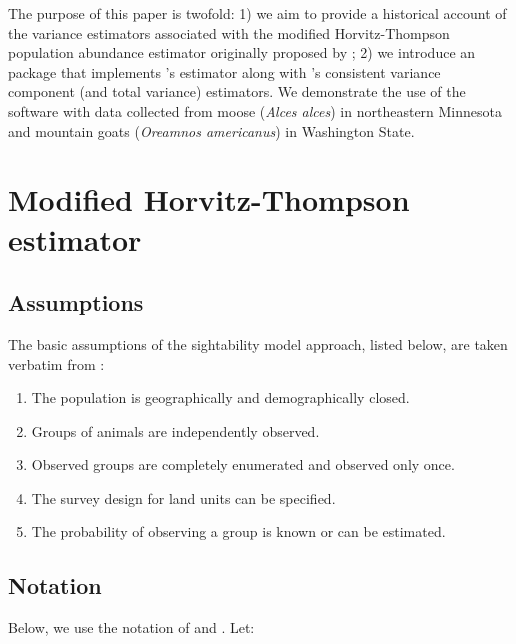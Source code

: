 \documentclass[nojss]{jss}
\begin{document}
The purpose of this paper is twofold:  1) we aim to provide a
historical account of the variance estimators associated with the
modified Horvitz-Thompson population abundance estimator originally
proposed by \citet{SS1989}; 2) we  introduce an  package
that implements \citet{SS1989}'s estimator along with
\citet{Wong1996}'s consistent variance component (and total
variance) estimators.  We demonstrate the use of the software with
data collected from moose (\emph{Alces alces}) in
  northeastern Minnesota and  mountain goats (\emph{Oreamnos americanus}) in Washington State.


\section{Modified Horvitz-Thompson estimator}

\subsection{Assumptions}
The basic assumptions of the sightability model approach, listed below, are taken verbatim from  \citet{SS1989}:
\begin{enumerate}
\item The population is geographically and demographically closed.
\item Groups of animals are independently observed.
\item Observed groups are completely enumerated and observed only
once.
\item The survey design for land units can be specified.
\item The probability of observing a group is known or can be
estimated.
\end{enumerate}

\subsection{Notation}

Below, we use the notation of \citet{thompson2002} and \citet{Wong1996}.  Let:
\end{document}
